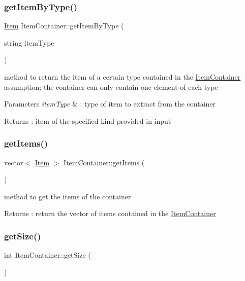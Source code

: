 \subsubsection{\texorpdfstring{get\+Item\+By\+Type()}{getItemByType()}}
{\footnotesize\ttfamily \hyperlink{class_item}{Item} Item\+Container\+::get\+Item\+By\+Type (\begin{DoxyParamCaption}\item[{string}]{item\+Type }\end{DoxyParamCaption})}

method to return the item of a certain type contained in the \hyperlink{class_item_container}{Item\+Container} assumption\+: the container can only contain one element of each type 
\begin{DoxyParams}{Parameters}
{\em item\+Type} & \+: type of item to extract from the container \\
\hline
\end{DoxyParams}
\begin{DoxyReturn}{Returns}
\+: item of the specified kind provided in input 
\end{DoxyReturn}
\hypertarget{class_item_container_af941b43394daa4ca6720f5b4acd578e0}{}\label{class_item_container_af941b43394daa4ca6720f5b4acd578e0} 
\subsubsection{\texorpdfstring{get\+Items()}{getItems()}}
{\footnotesize\ttfamily vector$<$ \hyperlink{class_item}{Item} $>$ Item\+Container\+::get\+Items (\begin{DoxyParamCaption}{ }\end{DoxyParamCaption})}

method to get the items of the container \begin{DoxyReturn}{Returns}
\+: return the vector of items contained in the \hyperlink{class_item_container}{Item\+Container} 
\end{DoxyReturn}
\hypertarget{class_item_container_a5969e0b433f10e7d2683a85f310b9c1c}{}\label{class_item_container_a5969e0b433f10e7d2683a85f310b9c1c} 
\subsubsection{\texorpdfstring{get\+Size()}{getSize()}}
{\footnotesize\ttfamily int Item\+Container\+::get\+Size (\begin{DoxyParamCaption}{ }\end{DoxyParamCaption})}



